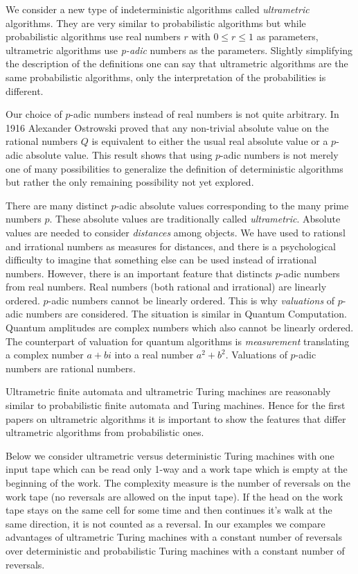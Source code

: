 \documentclass{llncs}
\begin{document}
We consider a new type of indeterministic algorithms called {\em ultrametric} algorithms. They are very similar to probabilistic algorithms but while probabilistic algorithms use real numbers $r$ with $0 \leq r \leq 1$ as parameters, ultrametric algorithms use {\em p-adic} numbers as the parameters.
Slightly simplifying the description of the definitions one can say that ultrametric algorithms are the same probabilistic algorithms, only the interpretation of the probabilities is different. 

Our choice of $p$-adic numbers instead of real numbers is not quite arbitrary. In 1916 Alexander Ostrowski 
proved that any non-trivial absolute value on the rational numbers $Q$ is equivalent to either the usual real absolute value or a $p$-adic absolute value.
This result shows that using $p$-adic numbers is not merely one of many possibilities to generalize the definition of deterministic algorithms but rather the only remaining possibility not yet explored.

There are many distinct $p$-adic absolute values corresponding to the many prime numbers $p$. These absolute values are traditionally  called {\em ultrametric}. 
Absolute values are needed to consider {\em distances} among objects. We have used to rationsl and irrational numbers as measures for distances, and there is a psychological difficulty to imagine that something else can be used instead of irrational numbers.
However, there is an important feature that distincts $p$-adic numbers from real numbers. Real numbers (both rational and irrational) are linearly ordered.
$p$-adic numbers cannot be linearly ordered. This is why {\em valuations} of $p$-adic numbers are considered. The situation is similar in Quantum Computation. Quantum amplitudes are complex numbers which also cannot be linearly ordered. The counterpart of valuation for quantum algorithms is {\em measurement} translating a complex number $a + bi$ into a real number $a^2 + b^2$. Valuations of $p$-adic numbers are rational numbers.

Ultrametric finite automata and ultrametric Turing machines are reasonably similar to probabilistic finite automata and Turing machines. Hence for the first papers on ultrametric algorithms it is important to show the features that differ ultrametric algorithms from probabilistic ones.


Below  we consider ultrametric versus deterministic Turing machines with one input tape which can be read only 1-way and a work tape which is empty at the beginning of the work.
The complexity measure is the number of reversals on the work tape (no reversals are allowed on the input tape). If the head on the work tape stays on the same cell for some time and then continues it's
walk at the same direction, it is not counted as a reversal. In our examples we compare advantages of ultrametric Turing machines with a constant number of reversals over deterministic and probabilistic Turing machines with a constant number of reversals.
\end{document}
